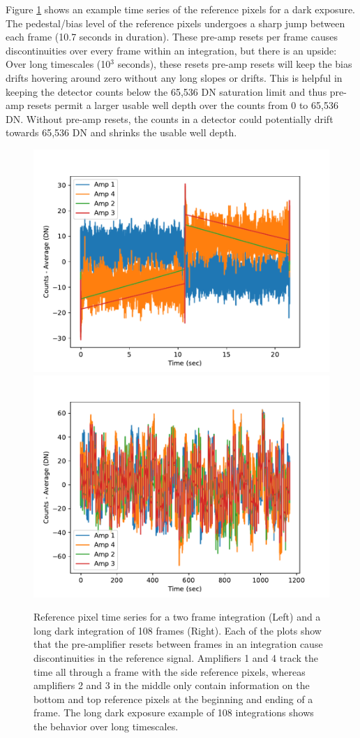\documentclass{aastex62}
\begin{document}
Figure \ref{fig:ampResetDark} shows an example time series of the reference pixels for a dark exposure.
The pedestal/bias level of the reference pixels undergoes a sharp jump between each frame (10.7 seconds in duration).
These pre-amp resets per frame causes discontinuities over every frame within an integration, but there is an upside:
Over long timescales (10$^3$ seconds), these resets pre-amp resets will keep the bias drifts hovering around zero without any long slopes or drifts.
This is helpful in keeping the detector counts below the 65,536 DN saturation limit and thus pre-amp resets permit a larger usable well depth over the counts from 0 to 65,536 DN.
Without pre-amp resets, the counts in a detector could potentially drift towards 65,536 DN and shrinks the usable well depth.

\begin{figure}[!hbtp]
\centering
\includegraphics[width=.49\columnwidth]{allamps.pdf}
\includegraphics[width=.49\columnwidth]{allamps_long_dark.pdf}
\caption{Reference pixel time series for a two frame integration (Left) and a long dark integration of 108 frames (Right). Each of the plots show that the pre-amplifier resets between frames in an integration cause discontinuities in the reference signal. Amplifiers 1 and 4 track the time all through a frame with the side reference pixels, whereas amplifiers 2 and 3 in the middle only contain information on the bottom and top reference pixels at the beginning and ending of a frame.
The long dark exposure example of 108 integrations shows the behavior over long timescales.}\label{fig:ampResetDark}
\end{figure}
\end{document}
